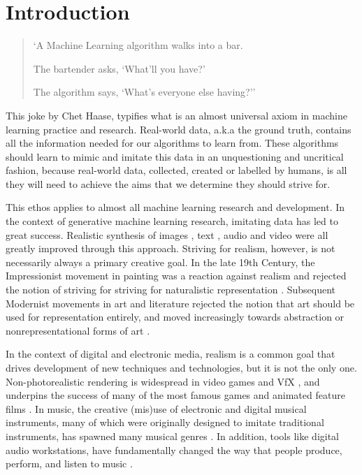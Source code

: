 \chapter{Introduction}
\label{ch:intro}

\begin{quote}

`A Machine Learning algorithm walks into a bar.

The bartender asks, `What'll you have?'

The algorithm says, `What's everyone else having?'' \citep{haase2017bar} \end{quote}

This joke by Chet Haase, typifies what is an almost universal axiom in machine learning practice and research. 
Real-world data, a.k.a the ground truth, contains all the information needed for our algorithms to learn from. 
These algorithms should learn to mimic and imitate this data in an unquestioning and uncritical fashion, because real-world data, collected, created or labelled by humans, is all they will need to achieve the aims that we determine they should strive for.

This ethos applies to almost all machine learning research and development. In the context of generative machine learning research, imitating data has led to great success. 
Realistic synthesis of images \citep{karras2019style}, text \citep{radford2018improving}, audio \citep{oord2016wavenet} and video \citep{openai2024sora} were all greatly improved through this approach. 
Striving for realism, however, is not necessarily always a primary creative goal.
In the late 19th Century, the Impressionist movement in painting was a reaction against realism and rejected the notion of striving for striving for naturalistic representation \citep{venturi1941aesthetic}. 
Subsequent Modernist movements in art and literature rejected the notion that art should be used for representation entirely, and moved increasingly towards abstraction or nonrepresentational forms of art \citep{lewis2007cambridge}.

In the context of digital and electronic media, realism is a common goal that drives development of new techniques and technologies, but it is not the only one. 
Non-photorealistic rendering is widespread in video games and VfX \citep{strothotte2002non}, and underpins the success of many of the most famous games and animated feature films \citep{kyprianidis2012state}. 
In music, the creative (mis)use of electronic and digital musical instruments, many of which were originally designed to imitate traditional instruments, has spawned many musical genres \citep{mcglynn2017happy}. 
In addition, tools like digital audio workstations, have fundamentally changed the way that people produce, perform, and listen to music \citep{ashbourn2021use}.

